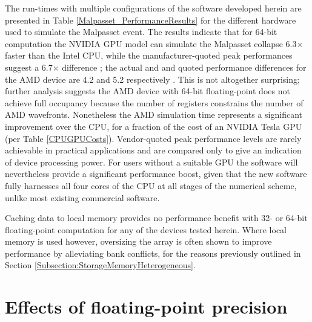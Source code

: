The run-times with multiple configurations of the software developed herein are presented in Table \ref{Malpasset_PerformanceResults} for the different hardware used to simulate the Malpasset event. The results indicate that for 64-bit computation the NVIDIA GPU model can simulate the Malpasset collapse 6.3$\times$ faster than the Intel CPU, while the manufacturer-quoted peak performances suggest a 6.7$\times$ difference \citep{NVIDIACorporation2011,IntelCorporation2012}; the actual and and quoted performance differences for the AMD device are 4.2 and 5.2 respectively \citep{AMD2012}. This is not altogether surprising; further analysis suggests the AMD device with 64-bit floating-point does not achieve full occupancy because the number of registers constrains the number of AMD wavefronts. Nonetheless the AMD simulation time represents a significant improvement over the CPU, for a fraction of the cost of an NVIDIA Tesla GPU (per Table \ref{CPUGPUCosts}). Vendor-quoted peak performance levels are rarely achievable in practical applications and are compared only to give an indication of device processing power. For users without a suitable GPU the software will nevertheless provide a significant performance boost, given that the new software fully harnesses all four cores of the CPU at all stages of the numerical scheme, unlike most existing commercial software.

Caching data to local memory provides no performance benefit with 32- or 64-bit floating-point computation for any of the devices tested herein. Where local memory is used however, oversizing the array is often shown to improve performance by alleviating bank conflicts, for the reasons previously outlined in Section \ref{Subsection:StorageMemoryHeterogeneous}.

\section{Effects of floating-point precision}

